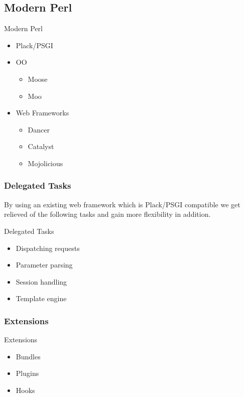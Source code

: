 \subsection{Modern Perl}

\begin{frame}{Modern Perl}
\begin{itemize}
\item Plack/PSGI
\item OO
  \begin{itemize}
  \item Moose
  \item Moo
  \end{itemize}
\item Web Frameworks
 \begin{itemize}
  \item Dancer
  \item Catalyst
  \item Mojolicious
  \end{itemize}
\end{itemize}
\end{frame}

\subsubsection{Delegated Tasks}
By using an existing web framework which is Plack/PSGI compatible
we get relieved of the following
tasks and gain more flexibility in
addition.
 
\begin{frame}{Delegated Tasks}
\begin{itemize}
\item Dispatching requests
\item Parameter parsing
\item Session handling
\item Template engine
\end{itemize}
\end{frame}

\subsubsection{Extensions}
\begin{frame}{Extensions}
\begin{itemize}
\item Bundles
\item Plugins
\item Hooks
\end{itemize}
\end{frame}


